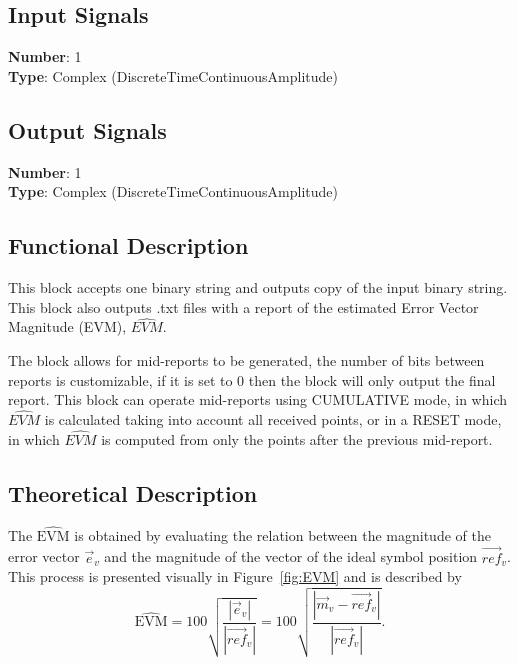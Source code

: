 \begin{refsection}
\begin{itemize}
\end{itemize}




\subsection*{Input Signals}

\textbf{Number}: 1\\
\textbf{Type}: Complex (DiscreteTimeContinuousAmplitude)


\subsection*{Output Signals}

\textbf{Number}: 1\\
\textbf{Type}: Complex (DiscreteTimeContinuousAmplitude)

\subsection*{Functional Description}

This block accepts one binary string and outputs copy of the input binary string. This block also outputs .txt files with a report of the estimated Error Vector Magnitude (EVM), $\widehat{EVM}$.
\par
The block allows for mid-reports to be generated, the number of bits between reports is customizable, if it is set to 0 then the block will only output the final report. This block can operate mid-reports using CUMULATIVE mode, in which $\widehat{EVM}$ is calculated taking into account all received points, or in a RESET mode, in which $\widehat{EVM}$ is computed from only the points after the previous mid-report.

\subsection*{Theoretical Description}

The $\widehat{\text{EVM}}$ is obtained by evaluating the relation between the magnitude of the error vector $\vec{e}_v$ and the magnitude of the vector of the ideal symbol position $\vec{ref}_v$. This process is presented visually in Figure~\ref{fig:EVM} and is described by
\begin{equation}
\widehat{\text{EVM}}=100\sqrt{\frac{|\vec{e}_v|}{|\vec{ref}_v|}}=100\sqrt{\frac{|\vec{m}_v-\vec{ref}_v|}{|\vec{ref}_v|}}.
\end{equation}


\end{refsection}
